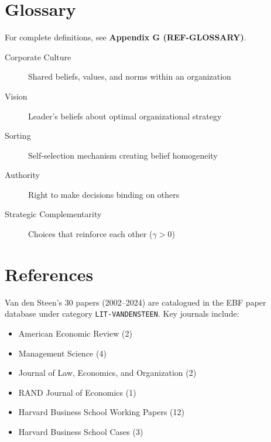 \section{Glossary}

For complete definitions, see \textbf{Appendix G (REF-GLOSSARY)}.

\begin{description}
    \item[Corporate Culture] Shared beliefs, values, and norms within an organization
    \item[Vision] Leader's beliefs about optimal organizational strategy
    \item[Sorting] Self-selection mechanism creating belief homogeneity
    \item[Authority] Right to make decisions binding on others
    \item[Strategic Complementarity] Choices that reinforce each other ($\gamma > 0$)
\end{description}

\section{References}

\nocite{bcm_master}

Van den Steen's 30 papers (2002--2024) are catalogued in the EBF paper database
under category \texttt{LIT-VANDENSTEEN}. Key journals include:
\begin{itemize}[nosep]
    \item American Economic Review (2)
    \item Management Science (4)
    \item Journal of Law, Economics, and Organization (2)
    \item RAND Journal of Economics (1)
    \item Harvard Business School Working Papers (12)
    \item Harvard Business School Cases (3)
\end{itemize}


